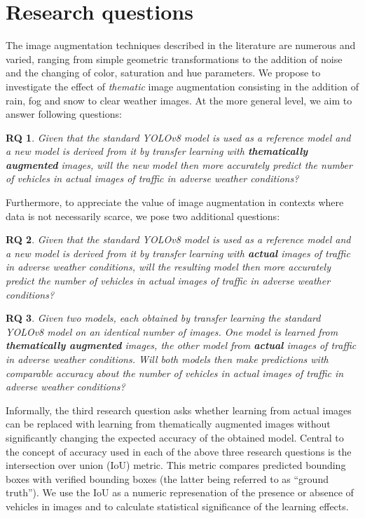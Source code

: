 \documentclass[]{article}
\newtheorem{researchquestion}{RQ}
\begin{document}
\section{Research questions}

	The image augmentation techniques described in the literature are numerous and varied, ranging from simple geometric transformations to the addition of noise and the changing of color, saturation and hue parameters. We propose to investigate the effect of \textit{thematic} image augmentation consisting in the addition of rain, fog and snow to clear weather images. At the more general level, we aim to answer following questions:

	\begin{researchquestion}
		\label{rq1}
		Given that the standard YOLO{\small v8} model is used as a reference model and a new model is derived from it by transfer learning with \textbf{\textit{thematically augmented}} images, will the new model then more accurately predict the number of vehicles in actual images of traffic in adverse weather conditions?
	\end{researchquestion}

	Furthermore, to appreciate the value of image augmentation in contexts where data is not necessarily scarce, we pose two additional questions:
	\begin{researchquestion}
		\label{rq2}
		Given that the standard YOLO{\small v8} model is used as a reference model and a new model is derived from it by transfer learning with \textbf{\textit{actual}} images of traffic in adverse weather conditions, will the resulting model then more accurately predict the number of vehicles in actual images of traffic in adverse weather conditions?
	\end{researchquestion}

	\begin{researchquestion}
		\label{rq3}
		Given two models, each obtained by transfer learning the standard YOLO{\small v8} model on an identical number of images. One model is learned from \textbf{\textit{thematically augmented}} images, the other model from \textbf{\textit{actual}} images of traffic in adverse weather conditions. Will both models then make predictions with comparable accuracy about the number of vehicles in actual images of traffic in adverse weather conditions?
	\end{researchquestion}

	Informally, the third research question asks whether learning from actual images can be replaced with learning from thematically augmented images without significantly changing the expected accuracy of the obtained model. Central to the concept of accuracy used in each of the above three research questions is the intersection over union (IoU) metric. This metric compares predicted bounding boxes with verified bounding boxes (the latter being referred to as ``ground truth''). We use the IoU as a numeric represenation of the presence or absence of vehicles in images and to calculate statistical significance of the learning effects. 
\end{document}
